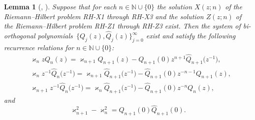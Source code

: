 \documentclass[10pt,a4paper]{amsart}
\numberwithin{equation}{section}
\newtheorem{Lemma}[Theorem]{Lemma}
 { \theoremstyle{definition}
\newtheorem{Definition}[Theorem]{Definition}
\newtheorem{Example}[Theorem]{Example}
\newtheorem{Remark}[Theorem]{Remark}
\newtheorem{Question}[Theorem]{Question}
}
\newcommand{\N}{{\mathbb N}}
\begin{document}
\begin{Lemma}[{\cite[Lemma 2.2]{DIK}, \cite{SzegoOP}}]\label{lemma 3term} Suppose that for each $n \!\in \N \cup \{0\}$ the solution $X(z;n)$ of the Riemann--Hilbert problem {\rm RH-X1} through {\rm RH-X3} and the solution $Z(z;n)$ of the Rie\-mann--Hilbert problem {\rm RH-Z1} through {\rm RH-Z3} exist. Then the system of bi-orthogonal poly\-no\-mi\-als~${\big\{Q_j(z),\widehat{Q}_j(z)\big\}^{\infty}_{j=0}}$ exist and satisfy the following recurrence relations for $n \in \N \cup \{0\}$:
			\begin{align}
				&	\varkappa_n z Q_n(z) = \varkappa_{n+1} Q_{n+1}(z) - Q_{n+1}(0) z^{n+1} \widehat{Q}_{n+1}\big(z^{-1}\big), \label{2.3 DIK} \\
				&	\varkappa_n z^{-1} \widehat{Q}_{n}\big(z^{-1}\big) = \varkappa_{n+1} \widehat{Q}_{n+1}\big(z^{-1}\big) - \widehat{Q}_{n+1}(0) z^{-n-1}Q_{n+1}(z), \label{2.4 DIK}\\
				&	\varkappa_{n+1} z^{-1} \widehat{Q}_{n}\big(z^{-1}\big) = \varkappa_{n} \widehat{Q}_{n+1}\big(z^{-1}\big) - \widehat{Q}_{n+1}(0) z^{-n}Q_{n}(z), \label{2.5 DIK}
			\end{align}
			and
			\begin{equation}
				\varkappa^2_{n+1} - \varkappa^2_{n} = Q_{n+1}(0) \widehat{Q}_{n+1}(0). \label{2.6 DIK}
			\end{equation}
		\end{Lemma}
		
\end{document}

